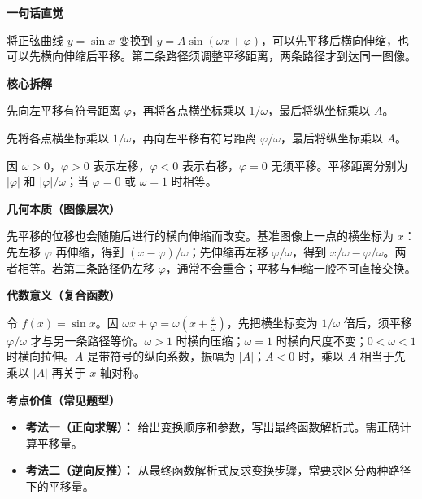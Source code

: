 \begin{explanationbox}
	\textbf{\textcolor{CExplanation}{一句话直觉}}

	将正弦曲线 $y=\sin x$ 变换到 $y=A\sin(\omega x+\varphi)$，可以先平移后横向伸缩，也可以先横向伸缩后平移。第二条路径须调整平移距离，两条路径才到达同一图像。

	\medskip
	\textbf{\textcolor{CExplanation}{核心拆解}}
	\begin{description}[style=nextline, leftmargin=2.8em, labelsep=0.5em, itemsep=0.45em]
		\item[\textbf{要点一（先移后缩）：}] 先向左平移有符号距离 $\varphi$，再将各点横坐标乘以 $1/\omega$，最后将纵坐标乘以 $A$。
		\item[\textbf{要点二（先缩后移）：}] 先将各点横坐标乘以 $1/\omega$，再向左平移有符号距离 $\varphi/\omega$，最后将纵坐标乘以 $A$。
		\item[\textbf{要点三（读懂符号）：}] 因 $\omega>0$，$\varphi>0$ 表示左移，$\varphi<0$ 表示右移，$\varphi=0$ 无须平移。平移距离分别为 $|\varphi|$ 和 $|\varphi|/\omega$；当 $\varphi=0$ 或 $\omega=1$ 时相等。
	\end{description}

	\medskip
	\textbf{\textcolor{CExplanation}{几何本质（图像层次）}}

	先平移的位移也会随随后进行的横向伸缩而改变。基准图像上一点的横坐标为 $x$：先左移 $\varphi$ 再伸缩，得到 $(x-\varphi)/\omega$；先伸缩再左移 $\varphi/\omega$，得到 $x/\omega-\varphi/\omega$。两者相等。若第二条路径仍左移 $\varphi$，通常不会重合；平移与伸缩一般不可直接交换。

	\medskip
	\textbf{\textcolor{CExplanation}{代数意义（复合函数）}}

	令 $f(x)=\sin x$。因 $\omega x+\varphi=\omega\left(x+\frac{\varphi}{\omega}\right)$，先把横坐标变为 $1/\omega$ 倍后，须平移 $\varphi/\omega$ 才与另一条路径等价。$\omega>1$ 时横向压缩；$\omega=1$ 时横向尺度不变；$0<\omega<1$ 时横向拉伸。$A$ 是带符号的纵向系数，振幅为 $|A|$；$A<0$ 时，乘以 $A$ 相当于先乘以 $|A|$ 再关于 $x$ 轴对称。

	\medskip
	\textbf{\textcolor{CExplanation}{考点价值（常见题型）}}
	\begin{itemize}[leftmargin=*, itemsep=0.5em, topsep=0.4em]
		\item \textbf{考法一（正向求解）：} 给出变换顺序和参数，写出最终函数解析式。需正确计算平移量。
		\item \textbf{考法二（逆向反推）：} 从最终函数解析式反求变换步骤，常要求区分两种路径下的平移量。
	\end{itemize}


\end{explanationbox}
